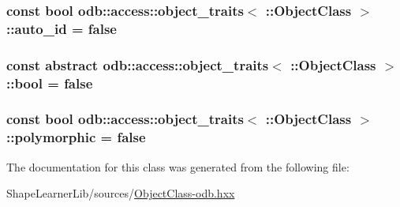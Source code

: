\subsubsection[{auto\+\_\+id}]{\setlength{\rightskip}{0pt plus 5cm}const {\bf bool} odb\+::access\+::object\+\_\+traits$<$ \+::{\bf Object\+Class} $>$\+::auto\+\_\+id = false\hspace{0.3cm}{\ttfamily [static]}}\label{classodb_1_1access_1_1object__traits_3_01_1_1_object_class_01_4_aa39fbc10492ca1c8deb95695c5e31a49}
\hypertarget{classodb_1_1access_1_1object__traits_3_01_1_1_object_class_01_4_a1f9680cb812834a08dfbf195bd41a057}{}
\subsubsection[{bool}]{\setlength{\rightskip}{0pt plus 5cm}const abstract odb\+::access\+::object\+\_\+traits$<$ \+::{\bf Object\+Class} $>$\+::bool = false\hspace{0.3cm}{\ttfamily [static]}}\label{classodb_1_1access_1_1object__traits_3_01_1_1_object_class_01_4_a1f9680cb812834a08dfbf195bd41a057}
\hypertarget{classodb_1_1access_1_1object__traits_3_01_1_1_object_class_01_4_abef923adc10f77aa212625b85325729f}{}
\subsubsection[{polymorphic}]{\setlength{\rightskip}{0pt plus 5cm}const {\bf bool} odb\+::access\+::object\+\_\+traits$<$ \+::{\bf Object\+Class} $>$\+::polymorphic = false\hspace{0.3cm}{\ttfamily [static]}}\label{classodb_1_1access_1_1object__traits_3_01_1_1_object_class_01_4_abef923adc10f77aa212625b85325729f}


The documentation for this class was generated from the following file\+:\begin{DoxyCompactItemize}
\item 
Shape\+Learner\+Lib/sources/\hyperlink{_object_class-odb_8hxx}{Object\+Class-\/odb.\+hxx}\end{DoxyCompactItemize}
